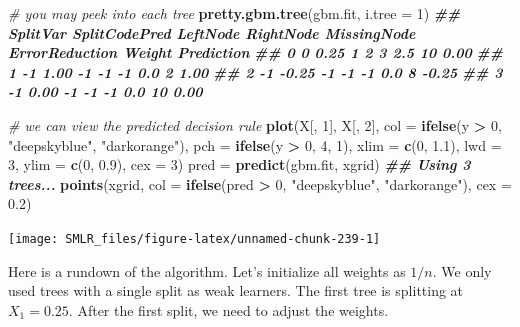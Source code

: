\documentclass[
]{book}
\newenvironment{Shaded}{\begin{snugshade}}{\end{snugshade}}
\newcommand{\AttributeTok}[1]{\textcolor[rgb]{0.13,0.29,0.53}{#1}}
\newcommand{\CommentTok}[1]{\textcolor[rgb]{0.56,0.35,0.01}{\textit{#1}}}
\newcommand{\DecValTok}[1]{\textcolor[rgb]{0.00,0.00,0.81}{#1}}
\newcommand{\DocumentationTok}[1]{\textcolor[rgb]{0.56,0.35,0.01}{\textbf{\textit{#1}}}}
\newcommand{\FloatTok}[1]{\textcolor[rgb]{0.00,0.00,0.81}{#1}}
\newcommand{\FunctionTok}[1]{\textcolor[rgb]{0.13,0.29,0.53}{\textbf{#1}}}
\newcommand{\NormalTok}[1]{#1}
\newcommand{\OtherTok}[1]{\textcolor[rgb]{0.56,0.35,0.01}{#1}}
\newcommand{\SpecialCharTok}[1]{\textcolor[rgb]{0.81,0.36,0.00}{\textbf{#1}}}
\newcommand{\StringTok}[1]{\textcolor[rgb]{0.31,0.60,0.02}{#1}}
\theoremstyle{definition}
\theoremstyle{definition}
\theoremstyle{definition}
\theoremstyle{definition}
\theoremstyle{remark}
\begin{document}
\begin{Shaded}
\begin{Highlighting}[]
  \CommentTok{\# you may peek into each tree}
  \FunctionTok{pretty.gbm.tree}\NormalTok{(gbm.fit, }\AttributeTok{i.tree =} \DecValTok{1}\NormalTok{)}
\DocumentationTok{\#\#   SplitVar SplitCodePred LeftNode RightNode MissingNode ErrorReduction Weight Prediction}
\DocumentationTok{\#\# 0        0          0.25        1         2           3            2.5     10       0.00}
\DocumentationTok{\#\# 1       {-}1          1.00       {-}1        {-}1          {-}1            0.0      2       1.00}
\DocumentationTok{\#\# 2       {-}1         {-}0.25       {-}1        {-}1          {-}1            0.0      8      {-}0.25}
\DocumentationTok{\#\# 3       {-}1          0.00       {-}1        {-}1          {-}1            0.0     10       0.00}
  
  \CommentTok{\# we can view the predicted decision rule}
  \FunctionTok{plot}\NormalTok{(X[, }\DecValTok{1}\NormalTok{], X[, }\DecValTok{2}\NormalTok{], }\AttributeTok{col =} \FunctionTok{ifelse}\NormalTok{(y }\SpecialCharTok{\textgreater{}} \DecValTok{0}\NormalTok{, }\StringTok{"deepskyblue"}\NormalTok{, }\StringTok{"darkorange"}\NormalTok{),}
       \AttributeTok{pch =} \FunctionTok{ifelse}\NormalTok{(y }\SpecialCharTok{\textgreater{}} \DecValTok{0}\NormalTok{, }\DecValTok{4}\NormalTok{, }\DecValTok{1}\NormalTok{), }\AttributeTok{xlim =} \FunctionTok{c}\NormalTok{(}\DecValTok{0}\NormalTok{, }\FloatTok{1.1}\NormalTok{), }\AttributeTok{lwd =} \DecValTok{3}\NormalTok{,}
       \AttributeTok{ylim =} \FunctionTok{c}\NormalTok{(}\DecValTok{0}\NormalTok{, }\FloatTok{0.9}\NormalTok{), }\AttributeTok{cex =} \DecValTok{3}\NormalTok{)}
\NormalTok{  pred }\OtherTok{=} \FunctionTok{predict}\NormalTok{(gbm.fit, xgrid)}
\DocumentationTok{\#\# Using 3 trees...}
  \FunctionTok{points}\NormalTok{(xgrid, }\AttributeTok{col =} \FunctionTok{ifelse}\NormalTok{(pred }\SpecialCharTok{\textgreater{}} \DecValTok{0}\NormalTok{, }\StringTok{"deepskyblue"}\NormalTok{, }\StringTok{"darkorange"}\NormalTok{), }
         \AttributeTok{cex =} \FloatTok{0.2}\NormalTok{)}
\end{Highlighting}
\end{Shaded}

\begin{center}\texttt{[image: SMLR\_files/figure-latex/unnamed-chunk-239-1]} \end{center}

Here is a rundown of the algorithm. Let's initialize all weights as \(1/n\). We only used trees with a single split as weak learners. The first tree is splitting at \(X_1 = 0.25\). After the first split, we need to adjust the weights.
\end{document}
